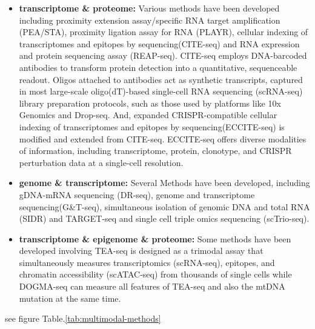 \begin{itemize}
	\item \textbf{transcriptome \& proteome:}
	Various methods have been developed including proximity extension assay/specific RNA target amplification (PEA/STA), proximity ligation assay for RNA (PLAYR), cellular indexing of transcriptomes and epitopes by sequencing(CITE-seq)\citep{stoeckius2017citeseq} and RNA expression and protein sequencing assay (REAP-seq)\citep{peterson2017reapseq}. CITE-seq employs DNA-barcoded antibodies to transform protein detection into a quantitative, sequenceable readout. Oligos attached to antibodies act as synthetic transcripts, captured in most large-scale oligo(dT)-based single-cell RNA sequencing (scRNA-seq) library preparation protocols, such as those used by platforms like 10x Genomics and Drop-seq. And, expanded CRISPR-compatible cellular indexing of transcriptomes and epitopes by sequencing(ECCITE-seq)\citep{mimitou2019ECCITE} is modified and extended from CITE-seq. ECCITE-seq offers diverse modalities of information, including transcriptome, protein, clonotype, and CRISPR perturbation data at a single-cell resolution. 

	\item \textbf{genome \& transcriptome:}
	Several Methods have been developed, including gDNA-mRNA sequencing (DR-seq)\citep{dey2015drseq}, genome and transcriptome sequencing(G\&T-seq)\citep{macaulay2015gttseq}, simultaneous isolation of genomic DNA and total RNA (SIDR)\citep{han2018sidr} and TARGET-seq\citep{rodriguez2019targetseq} and single cell triple omics sequencing (scTrio-seq)\citep{hou2016sctrioseq}. 

	\item \textbf{transcriptome \& epigenome \& proteome:}
	Some methods have been developed involving TEA-seq\citep{swanson2021simultaneous} is designed as a trimodal assay that simultaneously measures transcriptomics (scRNA-seq), epitopes, and chromatin accessibility (scATAC-seq) from thousands of single cells while DOGMA-seq\citep{mimitou2021scalable} can measure all features of TEA-seq and also the mtDNA mutation at the same time.
\end{itemize}





see figure Table.\ref{tab:multimodal-methods}

